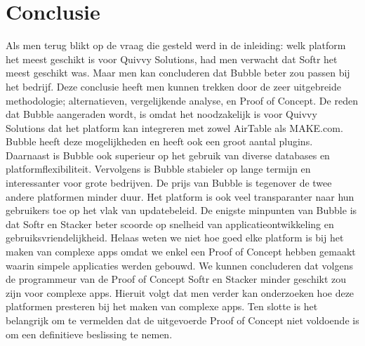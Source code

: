 
\chapter{Conclusie}%
\label{ch:conclusie}

Als men terug blikt op de vraag die gesteld werd in de inleiding: welk platform het meest geschikt is voor Quivvy Solutions, had men verwacht dat Softr het meest geschikt was. Maar men kan concluderen dat Bubble beter zou passen bij het bedrijf. 
Deze conclusie heeft men kunnen trekken door de zeer uitgebreide methodologie; alternatieven, vergelijkende analyse, en Proof of Concept. De reden dat Bubble aangeraden wordt, is omdat het noodzakelijk is voor Quivvy Solutions dat het platform
kan integreren met zowel AirTable als MAKE.com. Bubble heeft deze mogelijkheden en heeft ook een groot aantal plugins. Daarnaast is Bubble ook superieur op het gebruik van diverse databases en platformflexibiliteit.
Vervolgens is Bubble stabieler op lange termijn en interessanter voor grote bedrijven. De prijs van Bubble is tegenover de twee andere platformen minder duur. Het platform is ook veel transparanter naar hun 
gebruikers toe op het vlak van updatebeleid. De enigste minpunten van Bubble is dat Softr en Stacker beter scoorde op snelheid van applicatieontwikkeling en gebruiksvriendelijkheid. Helaas weten we niet hoe goed elke platform is bij het maken
van complexe apps omdat we enkel een Proof of Concept hebben gemaakt waarin simpele applicaties werden gebouwd. We kunnen concluderen dat volgens de programmeur van de Proof of Concept Softr en Stacker minder geschikt zou zijn voor complexe apps. Hieruit volgt dat men verder kan onderzoeken 
hoe deze platformen presteren bij het maken van complexe apps. Ten slotte is het belangrijk om te vermelden dat de uitgevoerde Proof of Concept niet voldoende is om een definitieve beslissing te nemen.


